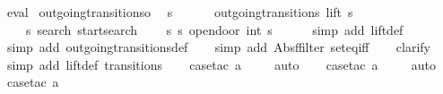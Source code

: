 \begin{isabellebody}
\ eval%
\endisatagproof
{\isafoldproof}%
%
\isadelimproof
\isanewline
%
\endisadelimproof
\isanewline
{}\isamarkupfalse%
\ outgoing{\isacharunderscore}transitions{\isacharunderscore}o{\isacharcolon}\isanewline
\ \ {\isachardoublequoteopen}s\ {\isasymin}\ {\isacharbraceleft}{}{\isacharcomma}\ {}{\isacharcomma}\ {}{\isacharcomma}\ {}{\isacharbraceright}\ {\isasymLongrightarrow}\isanewline
outgoing{\isacharunderscore}transitions\ lift\ s\ {\isacharequal}\ {\isacharbraceleft}{\isacharbar}\isanewline
\ \ \ \ {\isacharparenleft}{\isacharparenleft}s{\isacharcomma}\ search{\isacharparenright}{\isacharcomma}\ startsearch{\isacharparenright}{\isacharcomma}\isanewline
\ \ \ \ {\isacharparenleft}{\isacharparenleft}s{\isacharcomma}\ s{\isacharparenright}{\isacharcomma}\ opendoor\ {\isacharparenleft}int\ s\ {\isacharminus}\ {}{\isacharparenright}{\isacharparenright}\isanewline
{\isacharbar}{\isacharbraceright}{\isachardoublequoteclose}\isanewline
%
\isadelimproof
\isanewline
\ \ %
\endisadelimproof
%
\isatagproof
{}\isamarkupfalse%
\ {\isacharparenleft}simp\ add{\isacharcolon}\ lift{\isacharunderscore}def{\isacharparenright}\isanewline
\isanewline
\ \ \isamarkupfalse%
\ {\isacharparenleft}simp\ add{\isacharcolon}\ outgoing{\isacharunderscore}transitions{\isacharunderscore}def{\isacharparenright}\isanewline
\ \ \isamarkupfalse%
\ {\isacharparenleft}simp\ add{\isacharcolon}\ Abs{\isacharunderscore}ffilter\ set{\isacharunderscore}eq{\isacharunderscore}iff{\isacharparenright}\isanewline
\ \ \isamarkupfalse%
\ clarify\isanewline
\ \ \isamarkupfalse%
\ {\isacharparenleft}simp\ add{\isacharcolon}\ lift{\isacharunderscore}def\ transitions{\isacharparenright}\isanewline
\ \ \isamarkupfalse%
\ {\isacharparenleft}case{\isacharunderscore}tac\ {\isachardoublequoteopen}a{\isacharequal}{}{\isachardoublequoteclose}{\isacharparenright}\isanewline
\ \ \ \isamarkupfalse%
\ auto{\isacharbrackleft}{}{\isacharbrackright}\isanewline
\ \ \isamarkupfalse%
\ {\isacharparenleft}case{\isacharunderscore}tac\ {\isachardoublequoteopen}a{\isacharequal}{}{\isachardoublequoteclose}{\isacharparenright}\isanewline
\ \ \ \isamarkupfalse%
\ auto{\isacharbrackleft}{}{\isacharbrackright}\isanewline
\ \ \isamarkupfalse%
\ {\isacharparenleft}case{\isacharunderscore}tac\ {\isachardoublequoteopen}a{\isacharequal}{}{\isachardoublequoteclose}{\isacharparenright}\isanewline

\end{isabellebody}
